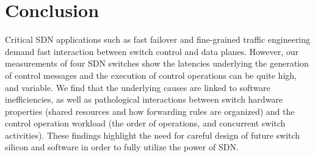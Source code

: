 \section{Conclusion}
\label{sec:conclusion}
Critical SDN applications such as fast failover and fine-grained traffic
engineering demand fast interaction between switch control and data planes.
However, our measurements of four SDN switches show the latencies
underlying the generation of control messages and the execution of control
operations can be quite high, and variable. 
%
%
%
We find that the underlying causes are linked to software inefficiencies, as
well as pathological interactions between switch hardware properties (shared
resources and how forwarding rules are organized) and the control operation
workload (the order of operations, and concurrent switch activities). 
These findings highlight the need for careful design of future switch
silicon and software in order to fully utilize the power of SDN.
